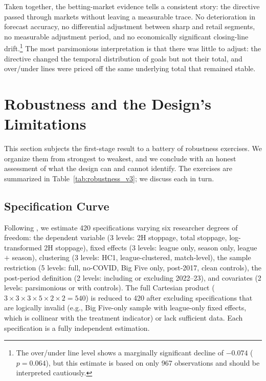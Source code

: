 \documentclass[12pt]{article}
\begin{document}
Taken together, the betting-market evidence tells a consistent story: the directive passed through markets without leaving a measurable trace. No deterioration in forecast accuracy, no differential adjustment between sharp and retail segments, no measurable adjustment period, and no economically significant closing-line drift.\footnote{The over/under line level shows a marginally significant decline of $-0.074$ ($p = 0.064$), but this estimate is based on only 967 observations and should be interpreted cautiously.} The most parsimonious interpretation is that there was little to adjust: the directive changed the temporal distribution of goals but not their total, and over/under lines were priced off the same underlying total that remained stable.


\section{Robustness and the Design's Limitations}
\label{sec:robustness}

This section subjects the first-stage result to a battery of robustness exercises. We organize them from strongest to weakest, and we conclude with an honest assessment of what the design can and cannot identify. The exercises are summarized in Table~\ref{tab:robustness_v3}; we discuss each in turn.




\subsection{Specification Curve}
\label{subsec:spec_curve}

Following \citet{simonsohn2020specification}, we estimate 420 specifications varying six researcher degrees of freedom: the dependent variable (3 levels: 2H stoppage, total stoppage, log-transformed 2H stoppage), fixed effects (3 levels: league only, season only, league $+$ season), clustering (3 levels: HC1, league-clustered, match-level), the sample restriction (5 levels: full, no-COVID, Big Five only, post-2017, clean controls), the post-period definition (2 levels: including or excluding 2022--23), and covariates (2 levels: parsimonious or with controls). The full Cartesian product ($3 \times 3 \times 3 \times 5 \times 2 \times 2 = 540$) is reduced to 420 after excluding specifications that are logically invalid (e.g., Big Five-only sample with league-only fixed effects, which is collinear with the treatment indicator) or lack sufficient data. Each specification is a fully independent estimation.
\end{document}
